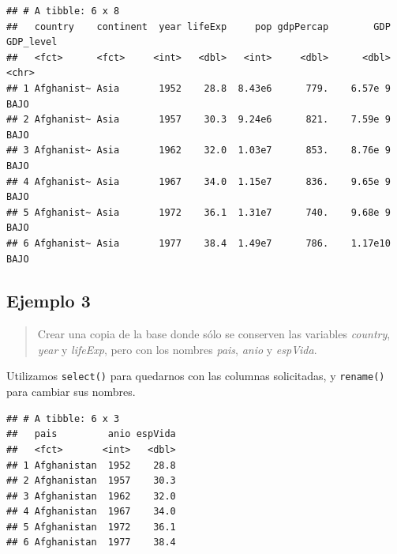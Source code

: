 \documentclass[]{book}
\newenvironment{Shaded}{\begin{snugshade}}{\end{snugshade}}
\newcommand{\DataTypeTok}[1]{\textcolor[rgb]{0.13,0.29,0.53}{#1}}
\newcommand{\KeywordTok}[1]{\textcolor[rgb]{0.13,0.29,0.53}{\textbf{#1}}}
\newcommand{\NormalTok}[1]{#1}
\newcommand{\OperatorTok}[1]{\textcolor[rgb]{0.81,0.36,0.00}{\textbf{#1}}}
\newcommand{\StringTok}[1]{\textcolor[rgb]{0.31,0.60,0.02}{#1}}
\begin{document}
\begin{verbatim}
## # A tibble: 6 x 8
##   country    continent  year lifeExp     pop gdpPercap        GDP GDP_level
##   <fct>      <fct>     <int>   <dbl>   <int>     <dbl>      <dbl> <chr>    
## 1 Afghanist~ Asia       1952    28.8  8.43e6      779.    6.57e 9 BAJO     
## 2 Afghanist~ Asia       1957    30.3  9.24e6      821.    7.59e 9 BAJO     
## 3 Afghanist~ Asia       1962    32.0  1.03e7      853.    8.76e 9 BAJO     
## 4 Afghanist~ Asia       1967    34.0  1.15e7      836.    9.65e 9 BAJO     
## 5 Afghanist~ Asia       1972    36.1  1.31e7      740.    9.68e 9 BAJO     
## 6 Afghanist~ Asia       1977    38.4  1.49e7      786.    1.17e10 BAJO
\end{verbatim}

\hypertarget{ejemplo-3}{%
\subsection{Ejemplo 3}\label{ejemplo-3}}

\begin{quote}
Crear una copia de la base donde sólo se conserven las variables \emph{country}, \emph{year} y \emph{lifeExp}, pero con los nombres \emph{pais}, \emph{anio} y \emph{espVida}.
\end{quote}

Utilizamos \texttt{select()} para quedarnos con las columnas solicitadas, y \texttt{rename()} para cambiar sus nombres.

\begin{Shaded}
\end{Shaded}

\begin{verbatim}
## # A tibble: 6 x 3
##   pais         anio espVida
##   <fct>       <int>   <dbl>
## 1 Afghanistan  1952    28.8
## 2 Afghanistan  1957    30.3
## 3 Afghanistan  1962    32.0
## 4 Afghanistan  1967    34.0
## 5 Afghanistan  1972    36.1
## 6 Afghanistan  1977    38.4
\end{verbatim}
\end{document}
